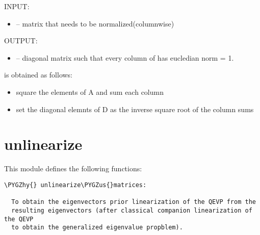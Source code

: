 \documentclass[letterpaper,10pt,english]{sphinxmanual}
\def\PYGZus{\char`\_}
\def\PYGZhy{\char`\-}
\begin{document}
\begin{fulllineitems}
\label{index:diagscale.normalize_cols}
INPUT:
\begin{itemize}
\item {} 
 -- matrix that needs to be normalized(columnwise)

\end{itemize}

OUTPUT:
\begin{itemize}
\item {} 
 -- diagonal matrix such that every column of  has eucledian norm = 1.

\end{itemize}

 is obtained as follows:
\begin{itemize}
\item {} 
square the elements of A and sum each column

\item {} 
set the diagonal elemnts of D as the inverse square root of the column sums

\end{itemize}

\end{fulllineitems}



\section{unlinearize}
\label{index:module-unlinearize}\label{index:unlinearize}
This module defines the following functions:

\begin{Verbatim}[commandchars=\\\{\}]
\PYGZhy{} unlinearize\PYGZus{}matrices:
  
  To obtain the eigenvectors prior linearization of the QEVP from the 
  resulting eigenvectors (after classical companion linearization of the QEVP
  to obtain the generalized eigenvalue propblem).
\end{Verbatim}
\end{document}
